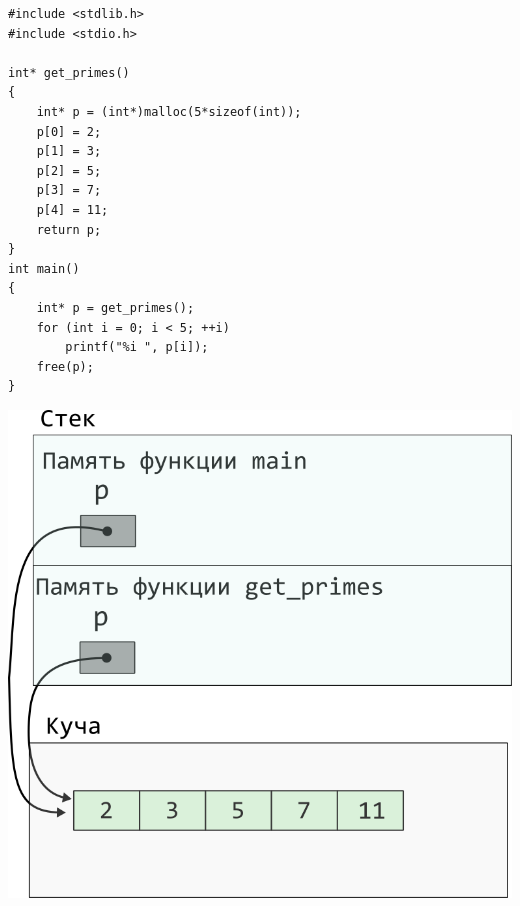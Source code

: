 \documentclass[10pt]{article}
\begin{document}
\noindent\begin{minipage}{.45\textwidth}
\begin{lstlisting}
#include <stdlib.h>
#include <stdio.h>

int* get_primes() 
{
    int* p = (int*)malloc(5*sizeof(int));
    p[0] = 2;
    p[1] = 3;
    p[2] = 5;
    p[3] = 7;
    p[4] = 11;
    return p;
}
int main() 
{
    int* p = get_primes();
    for (int i = 0; i < 5; ++i)
        printf("%i ", p[i]);
    free(p);
}
\end{lstlisting}
\end{minipage}
\begin{minipage}{.45\textwidth}
\includegraphics[scale=0.9]{../images/pointer_schemes/function_return_heap_array.png}
\end{minipage}
\end{document}
